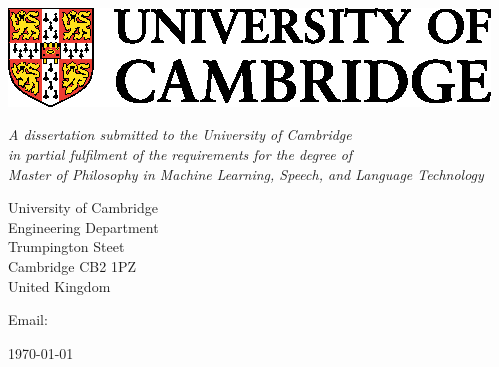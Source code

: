 \begin{titlepage}

\begin{center}
\noindent
\huge
\dissertationtitle \\
\end{center}

\begin{center}
\noindent
\huge
\authorname \\
\Large
\authorcollege      \\[24pt]
\includegraphics{CUni3.eps}
\end{center}

\vspace{24pt}

\begin{center}
\noindent
\large
{\it A dissertation submitted to the University of Cambridge \\
in partial fulfilment of the requirements for the degree of \\
Master of Philosophy in Machine Learning, Speech, and Language Technology}
\end{center}

\begin{center}
\noindent
University of Cambridge \\
Engineering Department \\
Trumpington Steet \\
Cambridge CB2 1PZ       \\
{\sc United Kingdom}    \\
\end{center}

\begin{center}
\noindent
Email: \authoremail \\
\end{center}

\begin{center}
\noindent
\today
\end{center}

\end{titlepage}

\newpage
\vspace*{\fill}
